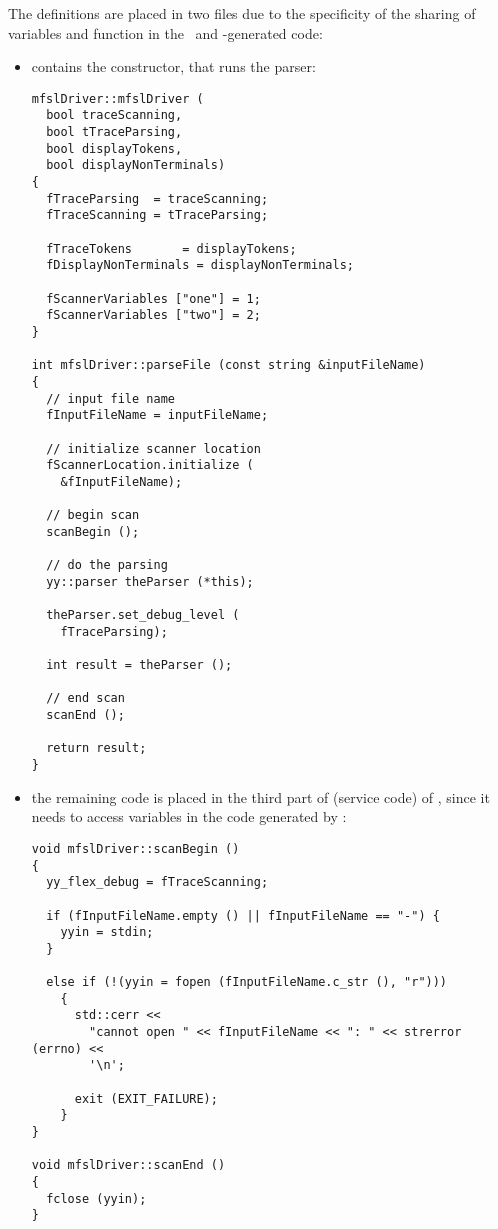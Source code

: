 The definitions are placed in two files due to the specificity of the sharing of variables and function in the \flex\ and \bison-generated code:
\begin{itemize}

\item {} contains the  constructor, that runs the parser:
\begin{lstlisting}[language=CPlusPlus]
mfslDriver::mfslDriver (
  bool traceScanning,
  bool tTraceParsing,
  bool displayTokens,
  bool displayNonTerminals)
{
  fTraceParsing  = traceScanning;
  fTraceScanning = tTraceParsing;

  fTraceTokens       = displayTokens;
  fDisplayNonTerminals = displayNonTerminals;

  fScannerVariables ["one"] = 1;
  fScannerVariables ["two"] = 2;
}

int mfslDriver::parseFile (const string &inputFileName)
{
  // input file name
  fInputFileName = inputFileName;

  // initialize scanner location
  fScannerLocation.initialize (
    &fInputFileName);

  // begin scan
  scanBegin ();

  // do the parsing
  yy::parser theParser (*this);

  theParser.set_debug_level (
    fTraceParsing);

  int result = theParser ();

  // end scan
  scanEnd ();

  return result;
}
\end{lstlisting}

\item the remaining code is placed in the third part of (service code) of , since it needs to access variables in the code generated by \flex:
\begin{lstlisting}[language=CPlusPlus]
void mfslDriver::scanBegin ()
{
  yy_flex_debug = fTraceScanning;

  if (fInputFileName.empty () || fInputFileName == "-") {
    yyin = stdin;
  }

  else if (!(yyin = fopen (fInputFileName.c_str (), "r")))
    {
      std::cerr <<
        "cannot open " << fInputFileName << ": " << strerror (errno) <<
        '\n';

      exit (EXIT_FAILURE);
    }
}

void mfslDriver::scanEnd ()
{
  fclose (yyin);
}
\end{lstlisting}

\end{itemize}


